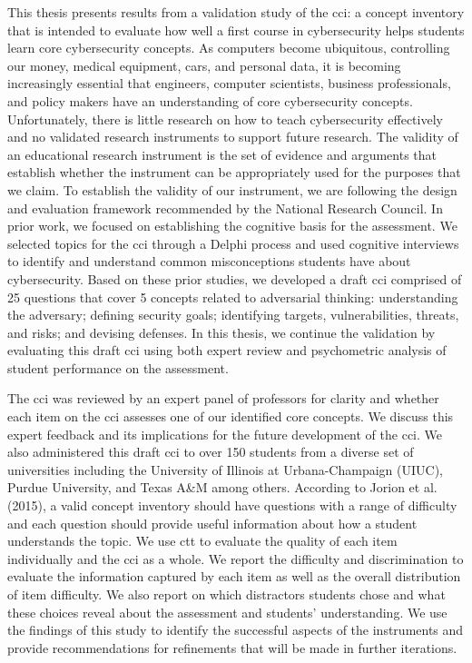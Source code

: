 \iflong
This thesis presents results from a validation study of the \glsdesc{cci}: a concept inventory that is intended to evaluate how well a first course in cybersecurity helps students learn core cybersecurity concepts. 
\fi
As computers become ubiquitous, controlling our money, medical equipment, cars, and personal data, it is becoming increasingly essential that engineers, computer scientists, business professionals, and policy makers have an understanding of core cybersecurity concepts. Unfortunately, there is little research on how to teach cybersecurity effectively and no validated research instruments to support future research. The validity of an educational research instrument is the set of evidence and arguments that establish whether the instrument can be appropriately used for the purposes that we claim. To establish the validity of our instrument, we are following the design and evaluation framework recommended by the National Research Council. In prior work, we focused on establishing the cognitive basis for the assessment. We selected topics for the \gls{cci} through a Delphi process and used cognitive interviews to identify and understand common misconceptions students have about cybersecurity. Based on these prior studies, we developed a draft \gls{cci} comprised of 25 questions that cover 5 concepts related to adversarial thinking: understanding the adversary; defining security goals; identifying targets, vulnerabilities, threats, and risks; and devising defenses. In this thesis, we continue the validation by evaluating this draft \gls{cci} using both expert review and psychometric analysis of student performance on the assessment.

\iflong
The \gls{cci} was reviewed by an expert panel of professors for clarity and whether each item on the \gls{cci} assesses one of our identified core concepts. We discuss this expert feedback and its implications for the future development of the \gls{cci}. We also administered this draft \gls{cci} to over 150 students from a diverse set of universities including the University of Illinois at Urbana-Champaign (UIUC), Purdue University, and Texas A\&M among others. According to Jorion et al. (2015), a valid concept inventory should have questions with a range of difficulty and each question should provide useful information about how a student understands the topic. We use \gls{ctt} to evaluate the quality of each item individually and the \gls{cci} as a whole. We report the difficulty and discrimination to evaluate the information captured by each item as well as the overall distribution of item difficulty. We also report on which distractors students chose and what these choices reveal about the assessment and students’ understanding. We use the findings of this study to identify the successful aspects of the instruments and provide recommendations for refinements that will be made in further iterations. 
\fi